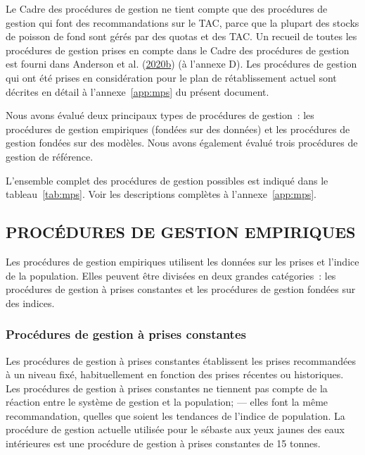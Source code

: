 \documentclass[french,11pt]{book}
\begin{document}
Le Cadre des procédures de gestion ne tient compte que des procédures de gestion qui font des recommandations sur le TAC, parce que la plupart des stocks de poisson de fond sont gérés par des quotas et des TAC. Un recueil de toutes les procédures de gestion prises en compte dans le Cadre des procédures de gestion est fourni dans Anderson et al. (\protect\hyperlink{ref-anderson2020gfmp}{2020b}) (à l'annexe D). Les procédures de gestion qui ont été prises en considération pour le plan de rétablissement actuel sont décrites en détail à l'annexe~\ref{app:mps} du présent document.

Nous avons évalué deux principaux types de procédures de gestion~: les procédures de gestion empiriques (fondées sur des données) et les procédures de gestion fondées sur des modèles. Nous avons également évalué trois procédures de gestion de référence.

L'ensemble complet des procédures de gestion possibles est indiqué dans le tableau~\ref{tab:mps}. Voir les descriptions complètes à l'annexe~\ref{app:mps}.

\hypertarget{procuxe9dures-de-gestion-empiriques}{%
\subsection{PROCÉDURES DE GESTION EMPIRIQUES}\label{procuxe9dures-de-gestion-empiriques}}

Les procédures de gestion empiriques utilisent les données sur les prises et l'indice de la population. Elles peuvent être divisées en deux grandes catégories~: les procédures de gestion à prises constantes et les procédures de gestion fondées sur des indices.

\hypertarget{procuxe9dures-de-gestion-uxe0-prises-constantes}{%
\subsubsection{Procédures de gestion à prises constantes}\label{procuxe9dures-de-gestion-uxe0-prises-constantes}}

Les procédures de gestion à prises constantes établissent les prises recommandées à un niveau fixé, habituellement en fonction des prises récentes ou historiques. Les procédures de gestion à prises constantes ne tiennent pas compte de la réaction entre le système de gestion et la population; --- elles font la même recommandation, quelles que soient les tendances de l'indice de population. La procédure de gestion actuelle utilisée pour le sébaste aux yeux jaunes des eaux intérieures est une procédure de gestion à prises constantes de 15 tonnes.
\end{document}
